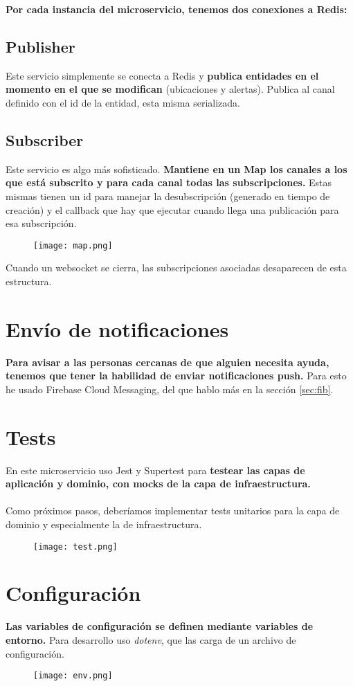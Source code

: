 \textbf{Por cada instancia del microservicio, tenemos dos conexiones a Redis:}
\subsection{Publisher}

Este servicio simplemente se conecta a Redis y \textbf{publica entidades en el momento en el que se modifican} (ubicaciones y alertas).
Publica al canal definido con el id de la entidad, esta misma serializada.

\subsection{Subscriber}
Este servicio es algo más sofisticado. \textbf{Mantiene en un Map los canales a los que está subscrito y 
para cada canal todas las subscripciones.} Estas mismas tienen un id para manejar la desubscripción (generado en tiempo de creación) y 
el callback que hay que ejecutar cuando llega una publicación para esa subscripción. 
\begin{figure}[H]
	\centering	
	\texttt{[image: map.png]}
	\end{figure}
Cuando un websocket se cierra, las subscripciones asociadas desaparecen de esta estructura.
\section{Envío de notificaciones}
\textbf{Para avisar a las personas cercanas de que alguien necesita ayuda, tenemos que tener la habilidad de enviar
notificaciones push.} Para esto he usado Firebase Cloud Messaging, del que hablo más en la sección \ref{sec:fib}.

\section{Tests}\label{sec:tests}
En este microservicio uso Jest y Supertest para \textbf{testear las capas de aplicación y dominio, con mocks de la capa de infraestructura.} \\ \\
Como próximos pasos, deberíamos implementar tests unitarios para la capa de dominio y especialmente la de infraestructura.
\begin{figure}[H]
	\centering	
	\texttt{[image: test.png]}
	\end{figure}

\section{Configuración}\label{sec:config}
\textbf{Las variables de configuración se definen mediante variables de entorno.} Para desarrollo uso \textit{dotenv}, 
que las carga de un archivo de configuración.
\begin{figure}[H]
	\centering	
	\texttt{[image: env.png]}
	\end{figure}

